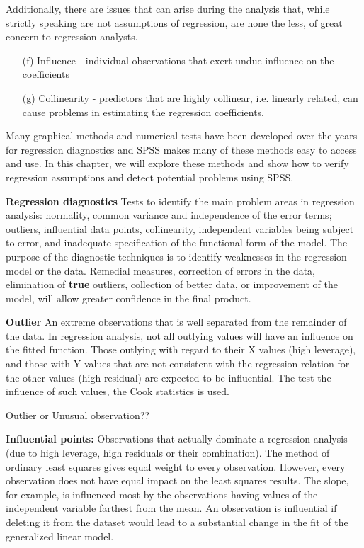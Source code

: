 Additionally, there are issues that can arise during the analysis that, while strictly speaking are not assumptions of regression, are none the less, of great concern to regression analysts.
\begin{itemize}
\item[(f)]Influence - individual observations that exert undue influence on the coefficients
\item[(g)]Collinearity - predictors that are highly collinear, i.e. linearly related, can cause problems in estimating the regression coefficients.
\end{itemize}
Many graphical methods and numerical tests have been developed over the years for regression diagnostics and SPSS makes many of these methods easy to access and use. In this chapter, we will explore these methods and show how to verify regression assumptions and detect potential problems using SPSS.






\textbf{Regression diagnostics} Tests to identify the main problem areas in regression analysis: normality, common variance and independence of the error terms; outliers, influential data points, collinearity, independent variables being subject to error, and inadequate specification of the functional form of the model. The purpose of the diagnostic techniques is to identify weaknesses in the regression model or the data. Remedial measures, correction of errors in the data, elimination of \textbf{true} outliers, collection of better data, or improvement of the model, will allow greater confidence in the final product.

\textbf{Outlier} An extreme observations that is well separated from the remainder of the data. In regression analysis, not all outlying values will have an influence on the fitted function. Those outlying with regard to their X values (high leverage), and those with Y values that are not consistent with the regression relation for the other values (high residual) are expected to be influential. The test the influence of such values, the Cook statistics is used.

Outlier or Unusual observation??

\textbf{Influential points:} Observations that actually dominate a regression analysis (due to high leverage, high residuals or their combination). The method of ordinary least squares gives equal weight to every observation. However, every observation does not have equal impact on the least squares results. The slope, for example, is influenced most by the observations having values of the independent variable farthest from the mean. An observation is influential if deleting it from the dataset would lead to a substantial change in the fit of the generalized linear model.


